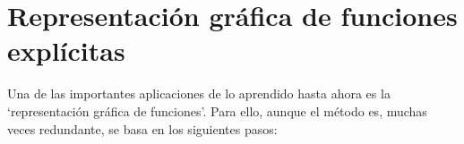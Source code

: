 \begin{enumerate}
	
\end{enumerate}

	
	
\section{Representación gráfica de funciones explícitas}

Una de las importantes aplicaciones de lo aprendido hasta ahora es la `representación gráfica de funciones'. Para ello, aunque el método es, muchas veces redundante, se basa en los siguientes pasos:


